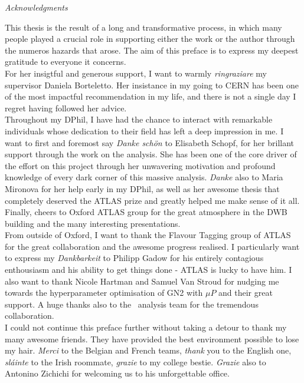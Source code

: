 \clearpage
{
\vspace{-1cm}
\begin{center}
\textit{\large \color{oxfordblue} Acknowledgments}
\end{center}}
This thesis is the result of a long and transformative process, in which many people played a crucial role in supporting either the work or the author through the numeros hazards that arose. The aim of this preface is to express my deepest gratitude to everyone it concerns. \\

For her insigtful and generous support, I want to warmly \textit{ringraziare} my supervisor Daniela Borteletto. Her insistance in my going to CERN has been one of the most impactful recommendation in my life, and there is not a single day I regret having followed her advice.\\

Throughout my DPhil, I have had the chance to interact with remarkable individuals whose dedication to their field has left a deep impression in me. I want to first and foremost say \textit{Danke schön} to Elisabeth Schopf, for her brillant support through the work on the analysis. She has been one of the core driver of the effort on this project through her unwavering motivation and profound knowledge of every dark corner of this massive analysis. \textit{Danke} also to Maria Mironova for her help early in my DPhil, as well as her awesome thesis that completely deserved the ATLAS prize and greatly helped me make sense of it all. Finally, cheers to Oxford ATLAS group for the great atmosphere in the DWB building and the many interesting presentations. \\

From outside of Oxford, I want to thank the Flavour Tagging group of ATLAS for the great collaboration and the awesome progress realised. I particularly want to express my \textit{Dankbarkeit} to Philipp Gadow for his entirely contagious enthousiasm and his ability to get things done - ATLAS is lucky to have him. I also want to thank Nicole Hartman and Samuel Van Stroud for nudging me towards the hyperparameter optimisation of GN2 with $\mu$$P$ and their great support. A huge thanks also to the \vhbc\ analysis team for the tremendous collaboration. \\

I could not continue this preface further without taking a detour to thank my many awesome friends. They have provided the best environment possible to lose my hair. \textit{Merci} to the Belgian and French teams, \textit{thank} you to the English one, \textit{sláinte} to the Irish roommate, \textit{grazie} to my college bestie. \textit{Grazie} also to Antonino Zichichi for welcoming us to his unforgettable office. \\

